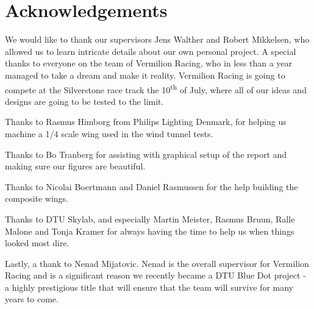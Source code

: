 \chapter*{Acknowledgements}

We would like to thank our supervisors Jens Walther and Robert Mikkelsen, who allowed us to learn intricate details about our own personal project. A special thanks to everyone on the team of Vermilion Racing, who in less than a year managed to take a dream and make it reality. Vermilion Racing is going to compete at the Silverstone race track the 10\textsuperscript{th} of July, where all of our ideas and designs are going to be tested to the limit.

Thanks to Rasmus Himborg from Philips Lighting Denmark, for helping us machine a 1/4 scale wing used in the wind tunnel tests.

Thanks to Bo Tranberg for assisting with graphical setup of the report and making sure our figures are beautiful.

Thanks to Nicolai Boertmann and Daniel Rasmussen for the help building the composite wings.

Thanks to DTU Skylab, and especially Martin Meister, Rasmus Bruun, Ralle Malone and Tonja Kramer for always having the time to help us when things looked most dire.

Lastly, a thank to Nenad Mijatovic. Nenad is the overall supervisor for Vermilion Racing and is a significant reason we recently became a DTU Blue Dot project - a highly prestigious title that will ensure that the team will survive for many years to come.
\newpage
\begin{figure}
  \label{fig:sponsorstack}
\end{figure}
